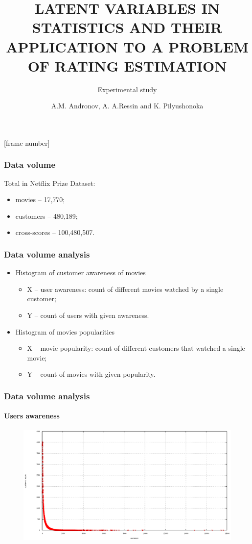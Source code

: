 \documentclass{beamer}
\title{LATENT VARIABLES IN STATISTICS AND THEIR APPLICATION TO A PROBLEM OF
RATING ESTIMATION }
\author{A.M. Andronov, A. A.Ressin and K. Pilyushonoka}
\subtitle{Experimental study}
\begin{document}
[frame number]
\begin{frame}
\titlepage
\end{frame}

\begin{frame}
\frametitle{Data volume}
Total in Netflix Prize\citep{netflix} Dataset: 
\begin{itemize}
  \item movies -- 17,770;
  \item customers -- 480,189;
  \item cross-scores -- 100,480,507. 
\end{itemize}
\end{frame}

\begin{frame}
\frametitle{Data volume analysis}
\begin{itemize}
  \item Histogram of customer awareness of movies   
  	\begin{itemize}
  	\item X -- user awareness: count of different movies watched by a single
  	customer;
  	\item Y -- count of users with given awareness.
	\end{itemize}
  \item Histogram of movies popularities
  	\begin{itemize}
  	\item X -- movie popularity: count of different customers that watched a
  	single movie;
  	\item Y -- count of movies with given popularity.
	\end{itemize}
\end{itemize}
\end{frame}

\begin{frame}
\frametitle{Data volume analysis}
\framesubtitle{Users awareness}
\begin{figure}[h] 
    \includegraphics[width=\linewidth]{users_awareness.png}
\end{figure}
\end{frame}
\end{document}
